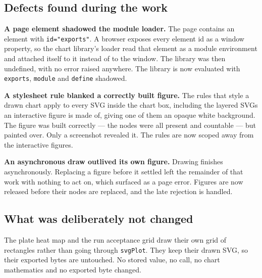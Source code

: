 \subsection*{Defects found during the work}

\textbf{A page element shadowed the module loader.} The page contains an element with
\texttt{id="exports"}. A browser exposes every element id as a window property, so the chart
library's loader read that element as a module environment and attached itself to it instead of to
the window. The library was then undefined, with no error raised anywhere. The library is now
evaluated with \texttt{exports}, \texttt{module} and \texttt{define} shadowed.

\textbf{A stylesheet rule blanked a correctly built figure.} The rules that style a drawn chart apply
to every SVG inside the chart box, including the layered SVGs an interactive figure is made of,
giving one of them an opaque white background. The figure was built correctly --- the nodes were all
present and countable --- but painted over. Only a screenshot revealed it. The rules are now scoped
away from the interactive figures.

\textbf{An asynchronous draw outlived its own figure.} Drawing finishes asynchronously. Replacing a
figure before it settled left the remainder of that work with nothing to act on, which surfaced as a
page error. Figures are now released before their nodes are replaced, and the late rejection is
handled.

\subsection*{What was deliberately not changed}

The plate heat map and the run acceptance grid draw their own grid of rectangles rather than going
through \texttt{svgPlot}. They keep their drawn SVG, so their exported bytes are untouched. No stored
value, no call, no chart mathematics and no exported byte changed.
